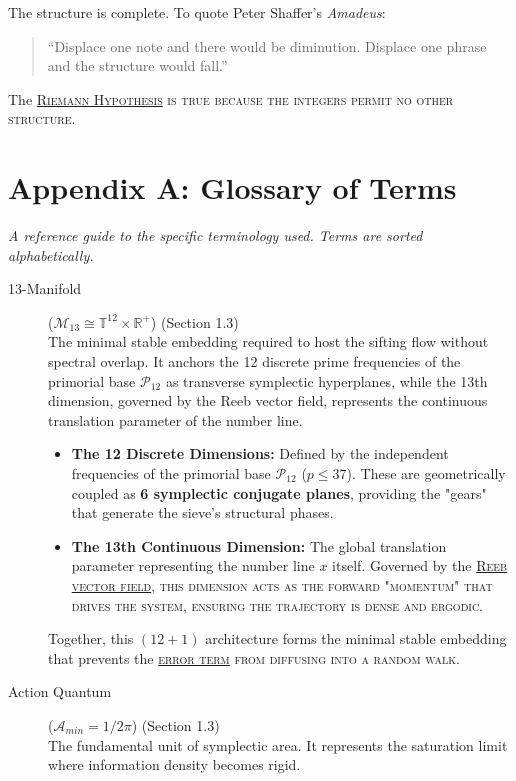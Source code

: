 \documentclass[sn-mathphys-num, pdflatex, referee]{sn-jnl}
\newcommand{\gterm}[2]{\begingroup\normalfont\scshape\hyperlink{#1}{#2}\endgroup}
\begin{document}
The structure is complete. To quote Peter Shaffer's \textit{Amadeus}:
\begin{quote}
``Displace one note and there would be diminution. Displace one phrase and the structure would fall.''
\end{quote}
The \gterm{rh}{Riemann Hypothesis} is true because the integers permit no other structure.
\section*{Appendix A: Glossary of Terms}
\textit{A reference guide to the specific terminology used. Terms are sorted alphabetically.}

\begin{description}
    \item[13-Manifold] \hypertarget{m13}{}\label{gloss:13manifold} ($\mathcal{M}_{13} \cong \mathbb{T}^{12} \times \mathbb{R}^+$) (Section 1.3) \hfill \\
    The minimal stable embedding required to host the sifting flow without spectral overlap. It anchors the 12 discrete prime frequencies of the primorial base $\mathcal{P}_{12}$ as transverse symplectic hyperplanes, while the 13th dimension, governed by the Reeb vector field, represents the continuous translation parameter of the number line.
\begin{itemize}
    \item \textbf{The 12 Discrete Dimensions:} Defined by the independent frequencies of the primorial base $\mathcal{P}_{12}$ ($p \le 37$). These are geometrically coupled as \textbf{6 symplectic conjugate planes}, providing the "gears" that generate the sieve's structural phases.
    \item \textbf{The 13th Continuous Dimension:} The global translation parameter representing the number line $x$ itself. Governed by the \gterm{reeb}{Reeb vector field}, this dimension acts as the forward "momentum" that drives the system, ensuring the trajectory is dense and ergodic.
\end{itemize}
Together, this $(12+1)$ architecture forms the minimal stable embedding that prevents the \gterm{error_term}{error term} from diffusing into a random walk.

    \item[Action Quantum] \hypertarget{action_quantum}{}\label{gloss:action} ($\mathcal{A}_{min} = 1/2\pi$) (Section 1.3) \hfill \\
    The fundamental unit of symplectic area. It represents the saturation limit where information density becomes rigid.


\end{description}
\end{document}
